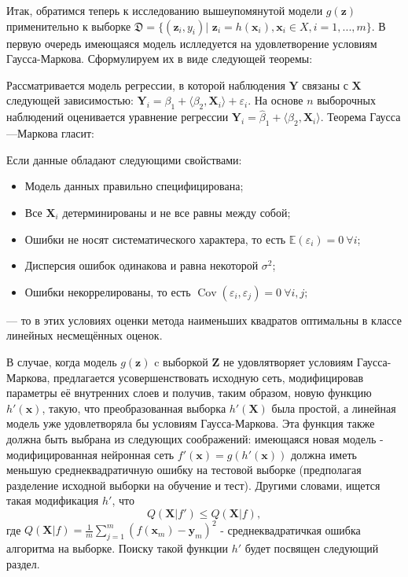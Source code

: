 \documentclass[12pt,twoside]{article}
\begin{document}
Итак, обратимся теперь к исследованию вышеупомянутой модели $g(\mathbf{z})$ применительно к выборке $\mathfrak{D} = \{(\mathbf{z}_i, y_i)|$ $ \mathbf{z}_i = h(\mathbf{x}_i), \mathbf{x}_i \in X, i = 1,...,m\}$. В первую очередь имеющаяся модель ислледуется на удовлетворение условиям Гаусса-Маркова. Сформулируем их в виде следующей теоремы: \par
\begin{Theorem}
Рассматривается модель регрессии, в которой наблюдения $\mathbf{Y}$ связаны с $\mathbf{X}$ следующей зависимостью: $\mathbf{Y}_i = \beta_1 + \langle\beta_2, \mathbf{X}_i\rangle + \varepsilon_i$. На основе $n$ выборочных наблюдений оценивается уравнение регрессии $\hat{\mathbf{Y}_i} = \hat\beta_1 + \langle\hat\beta_2, \mathbf{X}_i\rangle$. Теорема Гаусса—Маркова гласит:

Если данные обладают следующими свойствами:
\begin{itemize}
\item Модель данных правильно специфицирована; 
\item Все $\mathbf{X}_{i}$ детерминированы и не все равны между собой;
\item Ошибки не носят систематического характера, то есть $\mathbb{E}(\varepsilon_i) = 0\ \forall i$; 
\item Дисперсия ошибок одинакова и равна некоторой $\sigma ^{2}$;
\item Ошибки некоррелированы, то есть $\mathop{\mathrm{Cov}}(\varepsilon_i,\varepsilon_j)=0\ \forall i,j;$ 
\end{itemize}
— то в этих условиях оценки метода наименьших квадратов оптимальны в классе линейных несмещённых оценок.
\end{Theorem}
\par
В случае, когда модель $g(\mathbf{z})$ c выборкой $\mathbf{Z}$ не удовлятворяет условиям Гаусса-Маркова, предлагается усовершенствовать исходную сеть, модифицировав параметры её внутренних слоев и получив, таким образом, новую функцию $h'(\mathbf{x})$, такую, что преобразованная выборка $h'(\mathbf{X})$ была простой, а линейная модель уже удовлетворяла бы условиям Гаусса-Маркова. Эта функция также должна быть выбрана из следующих соображений: имеющаяся новая модель - модифицированная нейронная сеть $f'(\mathbf{x}) = g(h'(\mathbf{x}))$ должна иметь меньшую среднеквадратичную ошибку на тестовой выборке (предполагая разделение исходной выборки на обучение и тест). Другими словами, ищется такая модификация $h'$, что $$Q(\mathbf{X}|f') \leq Q(\mathbf{X}|f),$$ где $Q(\mathbf{X}|f) = \frac{1}{m}\sum_{j=1}^m(f(\mathbf{x}_m) - \mathbf{y}_m)^2$ - среднеквадратичкая ошибка алгоритма на выборке. Поиску такой функции $h'$ будет посвящен следующий раздел.
\end{document}
